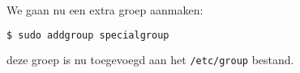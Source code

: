 We gaan nu een extra groep aanmaken:
\begin{lstlisting}[language=bash]
$ sudo addgroup specialgroup
\end{lstlisting}
deze groep is nu toegevoegd aan het \texttt{/etc/group} bestand.

